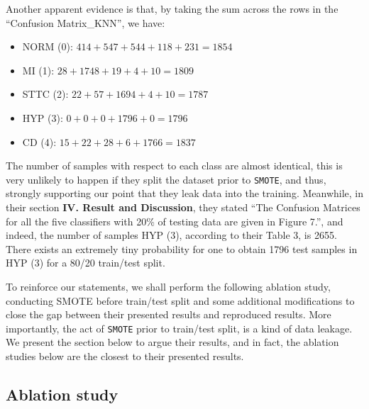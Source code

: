 Another apparent evidence is that, by taking the sum across the rows in the ``Confusion Matrix\_KNN'', we have:
\begin{itemize}
     \item NORM (0): $414 + 547 + 544 + 118 + 231 = 1854$
     \item MI (1): $28 + 1748 + 19 + 4 + 10 = 1809$
     \item STTC (2): $22 + 57 + 1694 + 4 + 10 = 1787$
     \item HYP (3): $0 + 0 + 0 + 1796 + 0 = 1796$
     \item CD (4): $15 + 22 + 28 + 6 + 1766 = 1837$
\end{itemize}
The number of samples with respect to each class are almost identical, this is very unlikely to happen if they split the dataset prior to \texttt{SMOTE}, and thus, strongly supporting our point that they leak data into the training.
Meanwhile, in their section \textbf{IV. Result and Discussion}, they stated ``The Confusion Matrices for all the five classifiers with 20\% of testing data are given in Figure 7.'', and indeed, the number of samples HYP (3), according to their Table 3, is 2655.
There exists an extremely tiny probability for one to obtain 1796 test samples in HYP (3) for a 80/20 train/test split.

To reinforce our statements, we shall perform the following ablation study, conducting SMOTE before train/test split and some additional modifications to close the gap between their presented results and reproduced results.
More importantly, the act of \texttt{SMOTE} prior to train/test split, is a kind of data leakage. We present the section below to argue their results, and in fact, the ablation studies below are the closest to their presented results.

\subsection{Ablation study}
